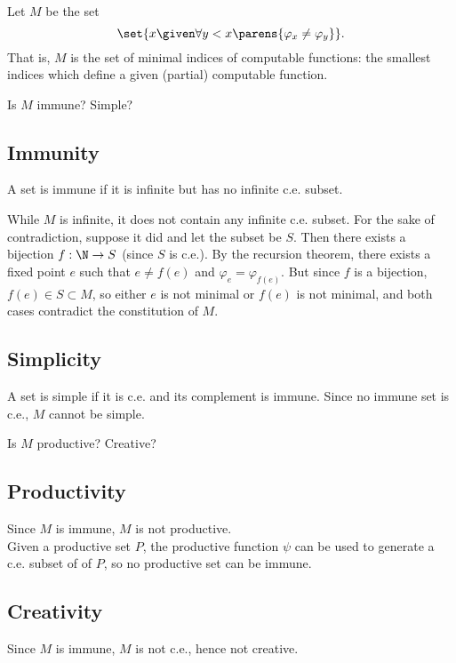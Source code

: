 \begin{problem}
  Let $M$ be the set
  \[ \set{ x \given \forall y < x \parens{ \varphi_x \neq \varphi_y } }. \]
  That is, $M$ is the set of minimal indices of computable functions:
  the smallest indices which define a given (partial) computable function.

  \begin{enumalph}
    \item Is $M$ immune? Simple?
      \begin{answer}

        \subsection*{Immunity}
        A set is immune if it is infinite but has no infinite c.e. subset.

        While $M$ is infinite, it does not contain any infinite c.e. subset.
        For the sake of contradiction, suppose it did
        and let the subset be $S$.
        Then there exists a bijection $f : \N \to S$ (since $S$ is c.e.).
        By the recursion theorem, there exists a fixed point $e$
        such that $e \neq f(e)$ and $\varphi_e = \varphi_{f(e)}$.
        But since $f$ is a bijection, $f(e) \in S \subset M$,
        so either $e$ is not minimal or $f(e)$ is not minimal,
        and both cases contradict the constitution of $M$.

        \subsection*{Simplicity}
        A set is simple if it is c.e. and its complement is immune.
        Since no immune set is c.e., $M$ cannot be simple.
        
      \end{answer}

    \item Is $M$ productive? Creative?
      \begin{answer}

        \subsection*{Productivity}
        Since $M$ is immune, $M$ is not productive. \\
        Given a productive set $P$,
        the productive function $\psi$
        can be used to generate a c.e. subset of of $P$,
        so no productive set can be immune.

        \subsection*{Creativity}
        Since $M$ is immune, $M$ is not c.e.,
        hence not creative.
      \end{answer}
  \end{enumalph}
\end{problem}
